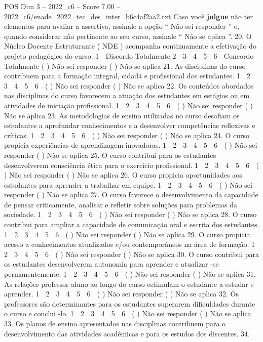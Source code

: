 \begin{textsample}{POS Dim 3 – 2022\_c6 – Score 7.00 – 2022\_c6/enade\_2022\_tec\_des\_inter\_b6c4af2aa2.txt}
Caso você \textbf{julgue} não ter elementos para avaliar a assertiva, assinale a opção “ Não sei responder ” e, quando considerar não pertinente ao seu curso, assinale “ Não se aplica ”. 20.
O Núcleo Docente Estruturante ( NDE ) acompanha continuamente a efetivação do projeto pedagógico do curso. 1 ⃝ Discordo Totalmente 2 ⃝ 3 ⃝ 4 ⃝ 5 ⃝ 6 ⃝ Concordo Totalmente ( ) Não sei responder ( ) Não se aplica 21.
As disciplinas do curso contribuem para a formação integral, cidadã e profissional dos estudantes. 1 ⃝ 2 ⃝ 3 ⃝ 4 ⃝ 5 ⃝ 6 ⃝ ( ) Não sei responder ( ) Não se aplica 22.
Os conteúdos abordados nas disciplinas do curso favorecem a atuação dos estudantes em estágios ou em atividades de iniciação profissional. 1 ⃝ 2 ⃝ 3 ⃝ 4 ⃝ 5 ⃝ 6 ⃝ ( ) Não sei responder ( ) Não se aplica 23.
As metodologias de ensino utilizadas no curso desafiam os estudantes a aprofundar conhecimentos e a desenvolver competências reflexivas e críticas. 1 ⃝ 2 ⃝ 3 ⃝ 4 ⃝ 5 ⃝ 6 ⃝ ( ) Não sei responder ( ) Não se aplica 24.
O curso propicia experiências de aprendizagem inovadoras. 1 ⃝ 2 ⃝ 3 ⃝ 4 ⃝ 5 ⃝ 6 ⃝ ( ) Não sei responder ( ) Não se aplica 25.
O curso contribui para os estudantes desenvolverem consciência ética para o exercício profissional. 1 ⃝ 2 ⃝ 3 ⃝ 4 ⃝ 5 ⃝ 6 ⃝ ( ) Não sei responder ( ) Não se aplica 26.
O curso propicia oportunidades aos estudantes para aprender a trabalhar em equipe. 1 ⃝ 2 ⃝ 3 ⃝ 4 ⃝ 5 ⃝ 6 ⃝ ( ) Não sei responder ( ) Não se aplica 27.
O curso favorece o desenvolvimento da capacidade de pensar criticamente, analisar e refletir sobre soluções para problemas da sociedade. 1 ⃝ 2 ⃝ 3 ⃝ 4 ⃝ 5 ⃝ 6 ⃝ ( ) Não sei responder ( ) Não se aplica 28.
O curso contribui para ampliar a capacidade de comunicação oral e escrita dos estudantes. 1 ⃝ 2 ⃝ 3 ⃝ 4 ⃝ 5 ⃝ 6 ⃝ ( ) Não sei responder ( ) Não se aplica 29.
O curso propicia acesso a conhecimentos atualizados e/ou contemporâneos na área de formação. 1 ⃝ 2 ⃝ 3 ⃝ 4 ⃝ 5 ⃝ 6 ⃝ ( ) Não sei responder ( ) Não se aplica 30.
O curso contribui para os estudantes desenvolverem autonomia para aprender e atualizar -se permanentemente. 1 ⃝ 2 ⃝ 3 ⃝ 4 ⃝ 5 ⃝ 6 ⃝ ( ) Não sei responder ( ) Não se aplica 31.
As relações professor-aluno ao longo do curso estimulam o estudante a estudar e aprender. 1 ⃝ 2 ⃝ 3 ⃝ 4 ⃝ 5 ⃝ 6 ⃝ ( ) Não sei responder ( ) Não se aplica 32.
Os professores são determinantes para os estudantes superarem dificuldades durante o curso e conclui -lo. 1 ⃝ 2 ⃝ 3 ⃝ 4 ⃝ 5 ⃝ 6 ⃝ ( ) Não sei responder ( ) Não se aplica 33.
Os planos de ensino apresentados nas disciplinas contribuem para o desenvolvimento das atividades acadêmicas e para os estudos dos discentes. 34.

\end{textsample}

